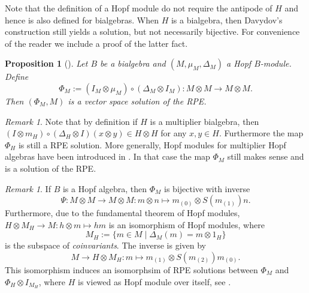 \documentclass[a4paper,10pt]{amsart}
\newtheorem{proposition}[lemma]{Proposition}
\theoremstyle{definition}
\theoremstyle{remark}
\newtheorem{remark}[lemma]{Remark}
\newcommand\D{\Delta}
\newcommand\ot{\otimes}
\begin{document}
Note that the definition of a Hopf module do not require the antipode of $H$ and hence is also defined for bialgebras. When $H$ is a bialgebra, then Davydov's construction still yields a solution, but not necessarily bijective. For convenience of the reader we include a proof of the latter fact.

\begin{proposition}[\cite{Dav}]\label{from bialg to PE}
Let $B$ be a bialgebra and $(M, \mu_M, \D_M)$ a Hopf $B$-module. Define
$$\Phi_M := (I_M \otimes \mu_M) \circ (\D_M \otimes I_M): M\ot M \rightarrow M \ot M .$$ 
Then $(\Phi_M, M)$ is a vector space solution of the RPE.   
\end{proposition}

\begin{remark}\label{sol for hopf multipliier}
Note that by definition if $H$ is a multiplier bialgebra, then $(I \ot m_H)\circ(\Delta_H \ot I)(x \ot y)  \in H \ot H$ for any $x,y\in H$. Furthermore the map $\Phi_H$ is still a RPE solution. More generally, Hopf modules for multiplier Hopf algebras have been introduced in \cite{KvDZ}. In that case the map $\Phi_M$ still makes sense and is a solution of the RPE.
\end{remark}

\begin{remark}\label{fund th hopf mod}
    If $B$ is a Hopf algebra, then $\Phi_M$ is bijective with inverse 
    $$\Psi : M\ot M \rightarrow M \ot M : m \ot n \mapsto m_{(0)} \ot S(m_{(1)})n.$$
    Furthermore, due to the fundamental theorem of Hopf modules, $H \ot M_H \rightarrow M: h\ot m \mapsto hm$ is an isomorphism of Hopf modules, where $$M_H :=\{ m \in M \mid \D_M(m)=m\ot1_H \}$$
    is the subspace of \emph{coinvariants}. The inverse is given by
    $$M \rightarrow H \ot M_H:  m \mapsto m_{(1)}\ot S(m_{(2)})m_{(0)}.$$
    This isomorphism induces an isomorphsim of RPE solutions between $\Phi_M$ and $\Phi_H \ot I_{M_H}$, where $H$ is viewed as Hopf module over itself, see \cite[Corollary 3.4]{Dav}.
\end{remark}
\end{document}
